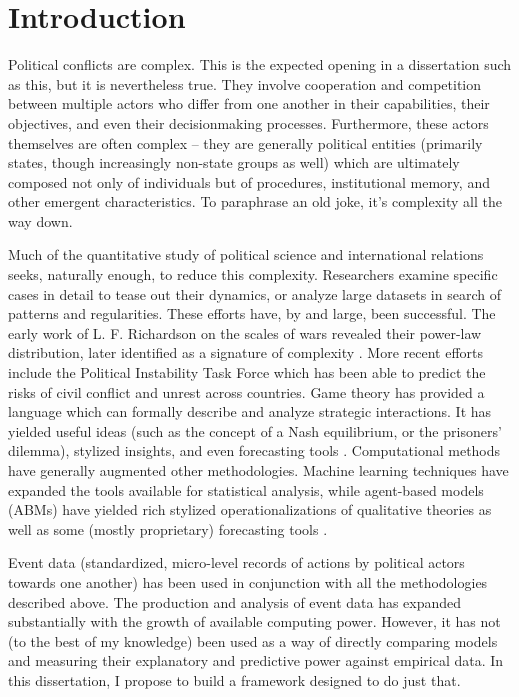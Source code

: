 \section{Introduction}\label{introduction}

Political conflicts are complex. This is the expected opening in a dissertation such as this, but it is nevertheless true. They involve cooperation and competition between multiple actors who differ from one another in their capabilities, their objectives, and even their decisionmaking processes. Furthermore, these actors themselves are often complex -- they are generally political entities (primarily states, though increasingly non-state groups as well) which are ultimately composed not only of individuals but of procedures, institutional memory, and other emergent characteristics. To paraphrase an old joke, it's complexity all the way down.

Much of the quantitative study of political science and international relations seeks, naturally enough, to reduce this complexity. Researchers examine specific cases in detail to tease out their dynamics, or analyze large datasets in search of patterns and regularities. These efforts have, by and large, been successful. The early work of L. F. Richardson on the scales of wars \citep{richardson_1948} revealed their power-law distribution, later identified as a signature of complexity \citep{clauset_2009}. More recent efforts include the Political Instability Task Force \citep{goldstone_2005} which has been able to predict the risks of civil conflict and unrest across countries. Game theory has provided a language which can formally describe and analyze strategic interactions. It has yielded useful ideas (such as the concept of a Nash equilibrium, or the prisoners' dilemma), stylized insights, and even forecasting tools \citep{bdm_2010}. Computational methods have generally augmented other methodologies. Machine learning techniques have expanded the tools available for statistical analysis, while agent-based models (ABMs) have yielded rich stylized operationalizations of qualitative theories \citep{cederman_1997,rouleau_2011} as well as some (mostly proprietary) forecasting tools \citep{taylor_2008}.

Event data (standardized, micro-level records of actions by political actors towards one another) has been used in conjunction with all the methodologies described above. The production and analysis of event data has expanded substantially with the growth of available computing power. However, it has not (to the best of my knowledge) been used as a way of directly comparing models and measuring their explanatory and predictive power against empirical data. In this dissertation, I propose to build a framework designed to do just that.

